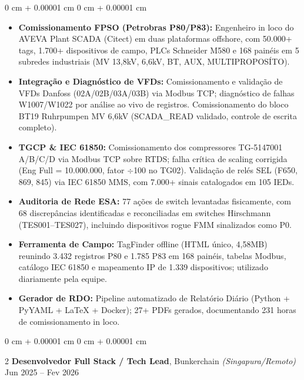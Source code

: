 \documentclass[10pt, letterpaper]{article}
\newenvironment{highlights}{ \begin{itemize}[ topsep=0.10 cm, parsep=0.10 cm, partopsep=0pt,
itemsep=0pt, leftmargin=0 cm + 10pt ] }{ \end{itemize} } %
\newenvironment{onecolentry}{ \begin{adjustwidth}{ 0 cm + 0.00001 cm }{ 0 cm + 0.00001 cm }
}{ \end{adjustwidth} } %
\newenvironment{twocolentry}[2][]{ \onecolentry \def\secondColumn{#2} \setcolumnwidth{\fill, 4.5 cm}
\begin{paracol}{2} }{ \switchcolumn \raggedleft \secondColumn \end{paracol}
\endonecolentry } %
\begin{document}
	\vspace{0.10 cm}
	\begin{onecolentry}
		\begin{highlights}
			\item \textbf{Comissionamento FPSO (Petrobras P80/P83):} Engenheiro in loco do AVEVA Plant SCADA (Citect) em duas plataformas offshore, com 50.000+ tags, 1.700+ dispositivos de campo, PLCs Schneider M580 e 168 pain\'eis em 5 subredes industriais (MV 13,8kV, 6,6kV, BT, AUX, MULTIPROPOS\'ITO).
            \item \textbf{Integra\c{c}\~ao e Diagn\'ostico de VFDs:} Comissionamento e valida\c{c}\~ao de VFDs Danfoss (02A/02B/03A/03B) via Modbus TCP; diagn\'ostico de falhas W1007/W1022 por an\'alise ao vivo de registros. Comissionamento do bloco BT19 Ruhrpumpen MV 6,6kV (SCADA\_READ validado, controle de escrita completo).
            \item \textbf{TGCP \& IEC 61850:} Comissionamento dos compressores TG-5147001 A/B/C/D via Modbus TCP sobre RTDS; falha cr\'itica de scaling corrigida (Eng Full = 10.000.000, fator $\div$100 no TG02). Valida\c{c}\~ao de rel\'es SEL (F650, 869, 845) via IEC 61850 MMS, com 7.000+ sinais catalogados em 105 IEDs.
			\item \textbf{Auditoria de Rede ESA:} 77 a\c{c}\~oes de switch levantadas fisicamente, com 68 discrepâncias identificadas e reconciliadas em switches Hirschmann (TES001--TES027), incluindo dispositivos rogue FMM sinalizados como P0.
            \item \textbf{Ferramenta de Campo:} TagFinder offline (HTML \'unico, 4,58MB) reunindo 3.432 registros P80 e 1.785 P83 em 168 pain\'eis, tabelas Modbus, cat\'alogo IEC 61850 e mapeamento IP de 1.339 dispositivos; utilizado diariamente pela equipe.
            \item \textbf{Gerador de RDO:} Pipeline automatizado de Relat\'orio Di\'ario (Python + PyYAML + LaTeX + Docker); 27+ PDFs gerados, documentando 231 horas de comissionamento in loco.
		\end{highlights}
	\end{onecolentry}

    \vspace{0.2 cm}

    \begin{twocolentry}
		{ Jun 2025 -- Fev 2026 } \textbf{Desenvolvedor Full Stack / Tech Lead}, Bunkerchain \textit{(Singapura/Remoto)}
	\end{twocolentry}
\end{document}
